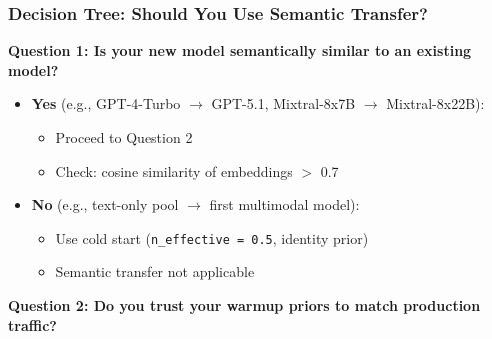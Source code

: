
\subsubsection{Decision Tree: Should You Use Semantic Transfer?}

\textbf{Question 1: Is your new model semantically similar to an existing model?}

\begin{itemize}[leftmargin=*, itemsep=2pt]
    \item \textbf{Yes} (e.g., GPT-4-Turbo $\to$ GPT-5.1, Mixtral-8x7B $\to$ Mixtral-8x22B):
    \begin{itemize}
        \item Proceed to Question 2
        \item Check: cosine similarity of embeddings $>$ 0.7
    \end{itemize}
    
    \item \textbf{No} (e.g., text-only pool $\to$ first multimodal model):
    \begin{itemize}
        \item Use cold start (\texttt{n\_effective = 0.5}, identity prior)
        \item Semantic transfer not applicable
    \end{itemize}
\end{itemize}

\textbf{Question 2: Do you trust your warmup priors to match production traffic?}

